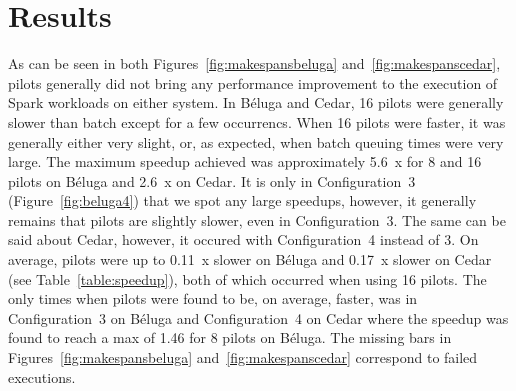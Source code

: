 \documentclass{IEEEtran}
\newcommand{\todo}[1]{\marginpar{\parbox{18mm}{\flushleft\tiny\color{red}\textbf{TODO}:
      #1}}}
\begin{document}


\section{Results}\label{sec:results}

As can be seen in both Figures~\ref{fig:makespansbeluga} and~\ref{fig:makespanscedar}, pilots 
generally did not bring any performance improvement to the execution of Spark workloads
on either system. In B\'eluga and Cedar, 16 pilots were generally slower than batch except for a 
few occurrencs. When 16 pilots were faster, it was generally either very slight, or, as expected,
when batch queuing times were very large. The maximum speedup achieved
was approximately 5.6~x for 8 and 16 pilots on B\'eluga and 2.6~x on Cedar. 
It is only in Configuration~3 (Figure~\ref{fig:beluga4})
that we spot any large speedups, however, it generally remains that
pilots are slightly slower, even in Configuration~3. The same can be said about Cedar, however,
it occured with Configuration~4 instead of 3. On average, pilots were up to 0.11~x slower on B\'eluga and
0.17~x slower on Cedar (see Table~\ref{table:speedup}), both of which occurred when using 16 pilots.
The only times when pilots were found to be, on average, faster, was in Configuration~3 on B\'eluga
and Configuration~4 on Cedar where the speedup was found to reach a max of 1.46 for 8 pilots on 
B\'eluga. The missing bars in Figures~\ref{fig:makespansbeluga} and~\ref{fig:makespanscedar} correspond to 
failed executions.
\end{document}
